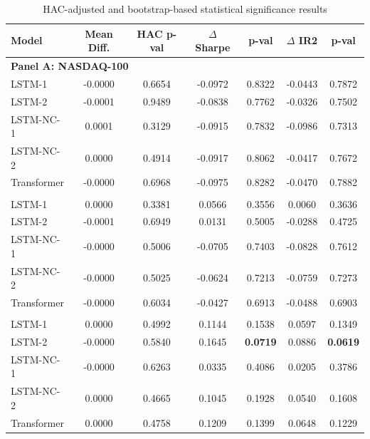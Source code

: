 \documentclass[]{elsarticle}
\begin{document}
\begin{table}[H]
\centering
\small
\setlength{\tabcolsep}{3pt}
\renewcommand{\arraystretch}{1.1}

\caption{HAC-adjusted and bootstrap-based statistical significance results}
\label{tab:hac_bootstrap_all}

\begin{tabular}{lcccccc}

\toprule
\textbf{Model} &
\textbf{Mean Diff.} &
\textbf{HAC p-val} &
\textbf{$\Delta$ Sharpe} &
\textbf{p-val} &
\textbf{$\Delta$ IR2} &
\textbf{p-val} \\
\midrule

\multicolumn{7}{l}{\textbf{Panel A: NASDAQ-100}} \\
\midrule
LSTM-1      & -0.0000 & 0.6654 & -0.0972 & 0.8322 & -0.0443 & 0.7872 \\
LSTM-2      & -0.0001 & 0.9489 & -0.0838 & 0.7762 & -0.0326 & 0.7502 \\
LSTM-NC-1   &  0.0001 & 0.3129 & -0.0915 & 0.7832 & -0.0986 & 0.7313 \\
LSTM-NC-2   &  0.0000 & 0.4914 & -0.0917 & 0.8062 & -0.0417 & 0.7672 \\
Transformer & -0.0000 & 0.6968 & -0.0975 & 0.8282 & -0.0470 & 0.7882 \\

\addlinespace

\multicolumn{7}{l}{\textbf{Panel B: Nikkei 225}} \\
\midrule
LSTM-1      &  0.0000 & 0.3381 & 0.0566 & 0.3556 & 0.0060 & 0.3636 \\
LSTM-2      & -0.0001 & 0.6949 & 0.0131 & 0.5005 & -0.0288 & 0.4725 \\
LSTM-NC-1   & -0.0000 & 0.5006 & -0.0705 & 0.7403 & -0.0828 & 0.7612 \\
LSTM-NC-2   & -0.0000 & 0.5025 & -0.0624 & 0.7213 & -0.0759 & 0.7273 \\
Transformer & -0.0000 & 0.6034 & -0.0427 & 0.6913 & -0.0488 & 0.6903 \\

\addlinespace

\multicolumn{7}{l}{\textbf{Panel C: EURO STOXX 50}} \\
\midrule
LSTM-1      &  0.0000 & 0.4992 & 0.1144 & 0.1538 & 0.0597 & 0.1349 \\
LSTM-2      & -0.0000 & 0.5840 & 0.1645 & \textbf{0.0719} & 0.0886 & \textbf{0.0619} \\
LSTM-NC-1   & -0.0000 & 0.6263 & 0.0335 & 0.4086 & 0.0205 & 0.3786 \\
LSTM-NC-2   &  0.0000 & 0.4665 & 0.1045 & 0.1928 & 0.0540 & 0.1608 \\
Transformer &  0.0000 & 0.4758 & 0.1209 & 0.1399 & 0.0648 & 0.1229 \\

\bottomrule

\end{tabular}
\end{table}
\end{document}
